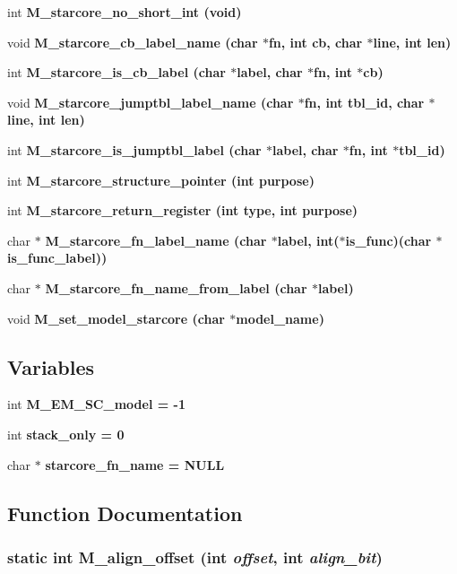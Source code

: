\begin{CompactItemize}
\item 
int \bf{M\_\-starcore\_\-no\_\-short\_\-int} (void)
\item 
void \bf{M\_\-starcore\_\-cb\_\-label\_\-name} (char $\ast$fn, int cb, char $\ast$line, int len)
\item 
int \bf{M\_\-starcore\_\-is\_\-cb\_\-label} (char $\ast$label, char $\ast$fn, int $\ast$cb)
\item 
void \bf{M\_\-starcore\_\-jumptbl\_\-label\_\-name} (char $\ast$fn, int tbl\_\-id, char $\ast$line, int len)
\item 
int \bf{M\_\-starcore\_\-is\_\-jumptbl\_\-label} (char $\ast$label, char $\ast$fn, int $\ast$tbl\_\-id)
\item 
int \bf{M\_\-starcore\_\-structure\_\-pointer} (int purpose)
\item 
int \bf{M\_\-starcore\_\-return\_\-register} (int type, int purpose)
\item 
char $\ast$ \bf{M\_\-starcore\_\-fn\_\-label\_\-name} (char $\ast$label, int($\ast$is\_\-func)(char $\ast$is\_\-func\_\-label))
\item 
char $\ast$ \bf{M\_\-starcore\_\-fn\_\-name\_\-from\_\-label} (char $\ast$label)
\item 
void \bf{M\_\-set\_\-model\_\-starcore} (char $\ast$model\_\-name)
\end{CompactItemize}
\subsection*{Variables}
\begin{CompactItemize}
\item 
int \bf{M\_\-EM\_\-SC\_\-model} = -1
\item 
int \bf{stack\_\-only} = 0
\item 
char $\ast$ \bf{starcore\_\-fn\_\-name} = \bf{NULL}
\end{CompactItemize}


\subsection{Function Documentation}
\subsubsection{\setlength{\rightskip}{0pt plus 5cm}static int M\_\-align\_\-offset (int {\em offset}, int {\em align\_\-bit})\hspace{0.3cm}{\tt  [static]}}\label{mi__starcore_8c_ad6bf5b83fe0b3c9e4cda1c22a10ed61}




